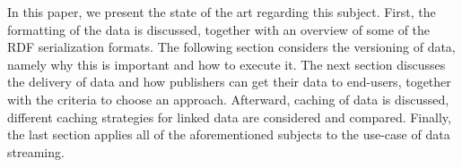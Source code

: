 \noindent In this paper, we present the state of the art regarding this subject. First, the formatting of the data is discussed, together with an overview of some of the RDF serialization formats. The following section considers the versioning of data, namely why this is important and how to execute it. The next section discusses the delivery of data and how publishers can get their data to end-users, together with the criteria to choose an approach. Afterward, caching of data is discussed, different caching strategies for linked data are considered and compared. Finally, the last section applies all of the aforementioned subjects to the use-case of data streaming.